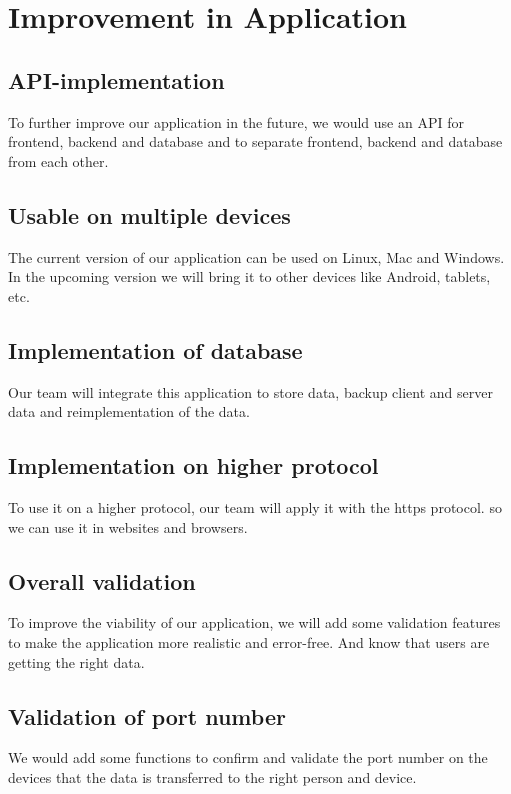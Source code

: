 \section{Improvement in Application}\label{sec:improvement-in-application}

\subsection{API-implementation}\label{subsec:apiimplementation}
To further improve our application in the future, we would use an API for frontend, backend and
database and to separate frontend, backend and database from each other.

\subsection{Usable on multiple devices} \label{subsec:usableonmultipledevices}
The current version of our application can be used on Linux, Mac and Windows.
In the upcoming version we will bring it to other devices like Android, tablets, etc.

\subsection{Implementation of database}\label{subsec:implementationdatabase}
Our team will integrate this application to store data, backup client and server data and
reimplementation of the data.

\subsection{Implementation on higher protocol}\label{subsec:implementation-on-higher-protocol}
To use it on a higher protocol, our team will apply it with the https protocol.
so we can use it in websites and browsers.

\subsection{Overall validation}\label{subsec:overall-validation}
To improve the viability of our application, we will add some validation features
to make the application more realistic and error-free.
And know that users are getting the right data.

\subsection{Validation of port number}\label{subsec:validation-of-port-number}
We would add some functions to confirm and validate the port number on the devices
that the data is transferred to the right person and device.



